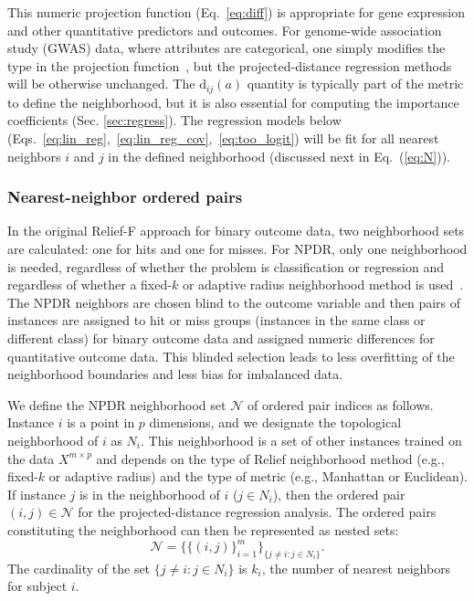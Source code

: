 \documentclass[10pt]{article}
\begin{document}
This numeric projection function (Eq.~\ref{eq:diff}) is appropriate for gene expression and other quantitative predictors and outcomes. For genome-wide association study (GWAS) data, where attributes are categorical, one simply modifies the type in the projection function~\cite{titv}, but the projected-distance regression methods will be otherwise unchanged. The $\text{d}_{ij}(a)$ quantity is typically part of the metric to define the neighborhood, but it is also essential for computing the importance coefficients (Sec. \ref{sec:regress}).  The regression models below (Eqs.~\ref{eq:lin_reg},~\ref{eq:lin_reg_cov},~\ref{eq:too_logit}) will be fit for all nearest neighbors $i$ and $j$ in the defined neighborhood (discussed next in Eq.~(\ref{eq:N})). 

\subsubsection{Nearest-neighbor ordered pairs}
In the original Relief-F approach for binary outcome data, two neighborhood sets are calculated: one for hits and one for misses.
For NPDR, only one neighborhood is needed, regardless of whether the problem is classification or regression and regardless of whether a fixed-$k$ or adaptive radius neighborhood method is used~\cite{greene09,urbanowicz17,mckinney13}. The NPDR neighbors are chosen blind to the outcome variable and then pairs of instances are assigned to hit or miss groups (instances in the same class or different class) for binary outcome data and assigned numeric differences for quantitative outcome data. This blinded selection leads to less overfitting of the neighborhood boundaries and less bias for imbalanced data.     

We define the NPDR neighborhood set $\mathcal{N}$ of ordered pair indices as follows. Instance $i$ is a point in $p$ dimensions, and we designate the topological neighborhood of $i$ as $N_{i}$. This neighborhood is a set of other instances trained on the data $X^{m \times p}$ and depends on the type of Relief neighborhood method (e.g., fixed-$k$ or adaptive radius) and the type of metric (e.g., Manhattan or Euclidean). If instance $j$ is in the neighborhood of $i$ ($j \in N_{i}$), then the ordered pair $(i,j) \in \mathcal{N}$ for the projected-distance regression analysis. The ordered pairs constituting the neighborhood can then be represented as nested sets:
\begin{equation}\label{eq:N}
\mathcal{N}=\{\{(i, j)\}_{i=1}^{m}\}_{\{j \ne i : j \in N_{i}\}}.
\end{equation}
The cardinality of the set $\{j \ne i : j \in N_{i}\}$ is $k_i$, the number of nearest neighbors for subject $i$. 
\end{document}
